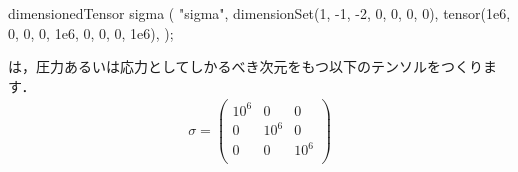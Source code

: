 \begin{OFverbatim}[terminal]
dimensionedTensor sigma
    (
        "sigma",
        dimensionSet(1, -1, -2, 0, 0, 0, 0),
        tensor(1e6, 0, 0, 0, 1e6, 0, 0, 0, 1e6),
    );
\end{OFverbatim}
は，圧力あるいは応力としてしかるべき次元をもつ以下のテンソルをつくります．
\begin{align}
 \label{eq:1.45}
 \sigma =
 \begin{pmatrix}
  10^{6} & 0 & 0 \\
  0 & 10^{6} & 0 \\
  0 & 0 & 10^{6} \\
 \end{pmatrix}
\end{align}

